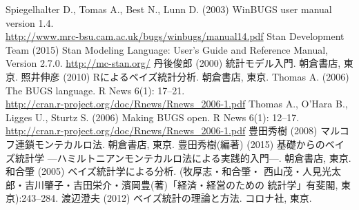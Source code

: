 \documentclass[11pt,uplatex]{jsarticle}
\begin{document}
\begin{thebibliography}{99}
 Spiegelhalter D., Tomas A., Best N., Lunn D. (2003)
  WinBUGS user manual version 1.4.\\
  \url{http://www.mrc-bsu.cam.ac.uk/bugs/winbugs/manual14.pdf}
 Stan Development Team (2015) Stan Modeling Language:
  User's Guide and Reference Manual, Version 2.7.0.
  \url{http://mc-stan.org/}
 丹後俊郎 (2000) 統計モデル入門. 朝倉書店, 東京.
 照井伸彦 (2010) Rによるベイズ統計分析. 朝倉書店, 東京.
 Thomas A. (2006) The BUGS language.
  R News 6(1): 17--21. \\
  \url{http://cran.r-project.org/doc/Rnews/Rnews_2006-1.pdf}
 Thomas A., O'Hara B., Ligges U., Sturtz S. (2006) Making BUGS open.
  R News 6(1): 12--17. \\
  \url{http://cran.r-project.org/doc/Rnews/Rnews_2006-1.pdf}
 豊田秀樹 (2008) マルコフ連鎖モンテカルロ法. 朝倉書店, 東京.
 豊田秀樹(編著) (2015) 基礎からのベイズ統計学
  ---ハミルトニアンモンテカルロ法による実践的入門---. 朝倉書店, 東京.
 和合肇 (2005) ベイズ統計学による分析. (牧厚志・和合肇・
  西山茂・人見光太郎・吉川肇子・吉田栄介・濱岡豊(著)「経済・経営のための
  統計学」有斐閣, 東京):243--284.
 渡辺澄夫 (2012) ベイズ統計の理論と方法. コロナ社, 東京.
\end{thebibliography}
\end{document}
